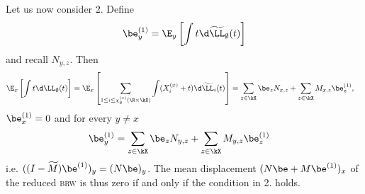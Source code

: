 \documentclass[10pt,a4paper]{article}
\newcommand{\brw}{\textsc{brw}\xspace}
\newcommand{\wM}{\widetilde{M}}
\begin{document}
Let us now consider 2. Define 
\[ \be_y^{(1)} = \E_y\left[\int t \d\widetilde\LL_\emptyset(t)\right]  \]
and recall $N_{y,z}$. 
Then
\begin{align*}
\E_x\left[ \int t \d\LL_\emptyset(t) \right] &= \E_x\left[ \sum_{1\leq i \leq \chi^{(x)}_\emptyset(\R\times\kX)} \int (X^{(x)}_i + t)\d\widetilde\LL_i(t) \right] 
= \sum_{z\in\kX} \be_z N_{x,z} + \sum_{z\in\kX} M_{x,z} \be^{(1)}_z ,
\end{align*}
$\be^{(1)}_x = 0$ and for every $y\neq x$ 
\begin{align*}
\be^{(1)}_y &= \sum_{z\in\kX} \be_z N_{y,z} + \sum_{z\in\kX} M_{y,z} \be^{(1)}_z 
\end{align*}
i.e.
$ ((I-\wM)\be^{(1)})_y = (N\be)_y $. The mean displacement $(N\be + M\be^{(1)})_x$ of the reduced \brw is thus zero if and only if the condition in 2. holds. 
\end{document}
